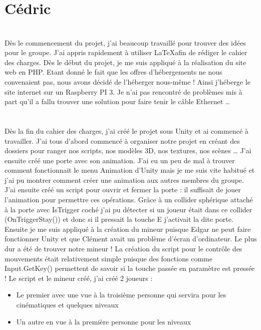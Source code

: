 \documentclass[titlepage, 13px, a4paper]{article}
\begin{document}
\newpage

\section{Cédric}
\paragraph{} \hspace{0pt} \\
Dès le commencement du projet, j’ai beaucoup travaillé pour trouver des idées pour le groupe.
J’ai appris rapidement à utiliser \LaTeX afin de rédiger le cahier des charges.
Dès le début du projet, je me suis appliqué à la réalisation du site web en PHP. 
Etant donné le fait que les offres d’hébergements ne nous convenaient pas, 
nous avons décidé de l’héberger nous-même ! Ainsi j’héberge le site internet sur un Raspberry PI 3. 
Je n’ai pas rencontré de problèmes mis à part qu’il a fallu trouver une solution pour faire tenir le câble Ethernet …

\paragraph{} \hspace{0pt} \\
Dès la fin du cahier des charges, j’ai créé le projet sous Unity et ai commencé à travailler.
J’ai tous d’abord commencé à organiser notre projet en créant des dossiers pour ranger nos scripts, 
nos modèles 3D, nos textures, nos scènes …
J’ai ensuite créé une porte avec son animation. J’ai eu un peu de mal à trouver comment fonctionnait 
le menu Animation d’Unity mais je me suis vite habitué et j’ai pu montrer comment créer une animation 
aux autres membres du groupe. J’ai ensuite créé un script pour ouvrir et fermer la porte : 
il suffisait de jouer l’animation pour permettre ces opérations.
Grâce à un collider sphérique attaché à la porte avec IsTrigger coché j’ai pu détecter 
si un joueur était dans ce collider (OnTriggerStay()) et donc si il pressait la touche E j’activait la dite porte.
Ensuite je me suis appliqué à la création du mineur puisque Edgar ne peut faire fonctionner Unity 
et que Clément avait un problème d’écran d’ordinateur. Le plus dur a été de trouver notre mineur !
La création du script pour le contrôle des mouvements était relativement simple puisque des fonctions 
comme Input.GetKey() permettent de savoir si la touche passée en paramètre est pressée !
Le script et le mineur créé, j’ai créé 2 joueurs :
{\begin{itemize}
	\item Le premier avec une vue à la troisième personne qui servira pour les cinématiques et quelques niveaux
	\item Un autre en vue à la première personne pour les niveaux  
\end{itemize}}
\end{document}
